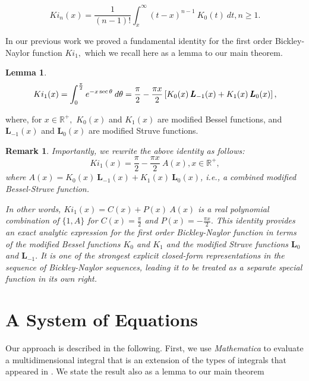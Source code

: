 \documentclass[pdflatex,sn-mathphys-num]{sn-jnl}%
\newtheorem{lemma}{Lemma}
\theoremstyle{thmstyleone}%
\theoremstyle{thmstyletwo}%
\newtheorem{remark}{Remark}%
\theoremstyle{thmstylethree}%
\begin{document}
\begin{equation}
    Ki_n(x) = \frac{1}{(n-1)!} \int_x^\infty
    (t-x)^{n-1}\:
     K_0(t) \:dt, n \ge 1.
\end{equation}

In our previous work \cite{Ruffa2024} we proved a fundamental identity for the first order Bickley-Naylor function $Ki_1,$ which we recall here as a lemma to our main theorem.

\begin{lemma}
\begin{equation}
Ki_1(x)
=\int_0^{\frac{\pi}{2}} e^{-x\sec\theta}\: d\theta\\
=\frac{\pi}{2} - \frac{\pi x}{2} \left[ K_0(x) \:\pmb{L}_{-1}(x) + K_1(x) \:\pmb{L}_0(x) \right], 
\label{Ki1}
\end{equation}
\end{lemma}
where, for $x\in \mathbb{R}^+,$ $K_0(x)$ and $K_1(x)$ are modified Bessel functions, and $\pmb{L}_{-1}(x)$ and $\pmb{L}_{0}(x)$ are modified Struve functions.

\begin{remark}
    Importantly, we rewrite the above identity as follows:
\begin{equation}
Ki_1(x)
=
\frac{\pi}{2} -\frac{\pi x}{2} \:A(x), x \in \mathbb{R}^+,
\label{Ki1!}
\end{equation}
where $A(x) = K_0(x) \:\pmb{L}_{-1}(x) + K_1(x)\:\pmb{L}_0(x)$, i.e., a combined modified Bessel-Struve function. 

In other words, $Ki_1(x) = C(x) + P(x) \:A(x)$ is a real polynomial combination of $\{1,A\}$ for $C(x)=\frac{\pi}{2}$ and $P(x) = -\frac{\pi x}{2}.$
This identity provides an exact analytic expression for the first order Bickley-Naylor function in terms of the modified Bessel functions $K_0$ and $K_1$ and the modified Struve functions $\pmb{L}_0$ and $\pmb{L}_{-1}.$ It is one of the strongest explicit closed-form representations in the sequence of Bickley-Naylor sequences, leading it to be treated as a separate special function in its own right. 
\end{remark}

\section{A System of Equations}

Our approach is described in the following. First, we use \emph{Mathematica} to evaluate a multidimensional integral that is an extension of the types of integrals that appeared in \cite{Ruffa2024}. We state the result also as a lemma to our main theorem
\end{document}
